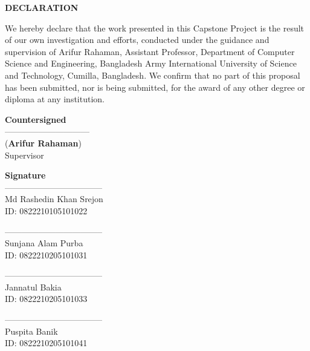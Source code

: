\clearpage
\thispagestyle{plain}

\begin{center}
    \textbf{\Large DECLARATION}
\end{center}

\vspace{0.5cm}


We hereby declare that the work presented in this Capstone Project is the result of our own investigation and efforts, conducted under the guidance and supervision of Arifur Rahaman, Assistant Professor, Department of Computer Science and Engineering, Bangladesh Army International University of Science and Technology, Cumilla, Bangladesh. We confirm that no part of this proposal has been submitted, nor is being submitted, for the award of any other degree or diploma at any institution.

\vspace{2cm}

\noindent
\begin{minipage}[t]{0.48\textwidth}
    \centering
    \textbf{Countersigned} \\[1.5cm]
    
    ------------------------------ \\
    (\textbf{Arifur Rahaman}) \\
    Supervisor
\end{minipage}
\hfill
\begin{minipage}[t]{0.48\textwidth}
    \centering
    \textbf{Signature} \\[1.5cm]
    
    ----------------------------------- \\
    Md Rashedin Khan Srejon \\
    ID: 0822210105101022
    
    \vspace{1.5cm}
    
    ----------------------------------- \\
    Sunjana Alam Purba \\
    ID: 0822210205101031
    
    \vspace{1.5cm}
    
    ----------------------------------- \\
    Jannatul Bakia \\
    ID: 0822210205101033
    
    \vspace{1.5cm}
    
    ----------------------------------- \\
    Puspita Banik \\
    ID: 0822210205101041
\end{minipage}